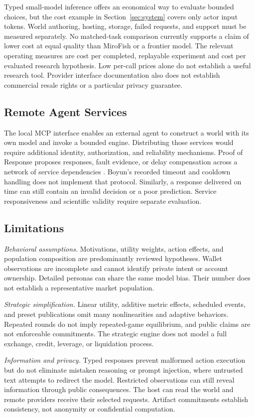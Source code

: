 Typed small-model inference offers an economical way to evaluate bounded
choices, but the cost example in Section~\ref{sec:system} covers only actor
input tokens. World authoring, hosting, storage, failed requests, and support
must be measured separately. No matched-task comparison currently supports a
claim of lower cost at equal quality than MiroFish or a frontier model.
The relevant operating measures are cost per completed, replayable experiment
and cost per evaluated research hypothesis. Low per-call prices alone do not
establish a useful research tool. Provider interface documentation also does
not establish commercial resale rights or a particular privacy guarantee.

\subsection{Remote Agent Services}
The local MCP interface enables an external agent to construct a world with
its own model and invoke a bounded engine. Distributing those services would
require additional identity, authorization, and reliability mechanisms.
Proof of Response proposes responses, fault evidence, or delay compensation
across a network of service dependencies \cite{proofresponse2025}. Boyun's
recorded timeout and cooldown handling does not implement that protocol.
Similarly, a response delivered on time can still contain an invalid decision
or a poor prediction. Service responsiveness and scientific validity require
separate evaluation.

\subsection{Limitations}\label{sec:limits}
\emph{Behavioral assumptions.} Motivations, utility weights, action effects,
and population composition are predominantly reviewed hypotheses. Wallet
observations are incomplete and cannot identify private intent or account
ownership. Detailed personas can share the same model bias. Their number
does not establish a representative market population.

\emph{Strategic simplification.} Linear utility, additive metric effects,
scheduled events, and preset publications omit many nonlinearities and
adaptive behaviors. Repeated rounds do not imply repeated-game equilibrium,
and public claims are not enforceable commitments. The strategic engine does
not model a full exchange, credit, leverage, or liquidation process.

\emph{Information and privacy.} Typed responses prevent malformed action
execution but do not eliminate mistaken reasoning or prompt injection, where
untrusted text attempts to redirect the model. Restricted observations can
still reveal information through public consequences. The host can read the
world and remote providers receive their selected requests. Artifact
commitments establish consistency, not anonymity or confidential computation.

